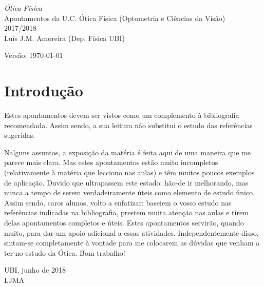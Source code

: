 \begin{titlepage}
\noindent
{\Huge\sffamily\textsl{Ótica Física}}\\[10mm]
{\Large\textsf{Apontamentos da U.C. Ótica Física
(Optometria e Ciências da Visão)}}\\[5mm]
{\Large\textsf 2017/2018}\\[15mm]
{\large\textsf{Luís J.M. Amoreira (Dep. Física UBI)}}

\vspace{35mm}
\noindent
{\small \textsf{Versão: \today}}
\vfill
\begin{center}
\end{center}
\vfill
\end{titlepage}
\thispagestyle{plain}
\section*{Introdução}
Estes apontamentos devem ser vistos como um complemento à bibliografia
recomendada. Assim sendo, a sua leitura não substitui o estudo das 
referências sugeridas.

\noindent
Nalguns assuntos, a exposição da matéria é feita aqui de uma maneira que me
parece mais clara. Mas estes apontamentos estão muito incompletos (relativamente
à matéria que lecciono nas aulas) e têm muitos poucos exemplos de aplicação.
Duvido que ultrapassem este estado: hão-de ir melhorando, mas nunca a tempo de
serem verdadeiramente úteis como elemento de estudo único. Assim sendo, caros
alunos, volto a enfatizar: baseiem o vosso estudo nas referências indicadas na
bibliografia, prestem muita atenção nas aulas e tirem delas apontamentos
completos e úteis. Estes apontamentos servirão, quando muito, para dar um apoio
adicional a essas atividades. Independentemente disso, sintam-se completamente à
vontade para me colocarem as dúvidas que venham a ter no estudo da Ótica.
\noindent
Bom trabalho!

\vspace{2cm}
\hfill
\begin{minipage}{0.4\linewidth}
UBI, junho de 2018\\
LJMA
\end{minipage}

\vspace{3cm}

